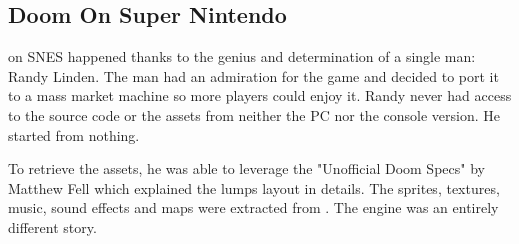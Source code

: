 \pagebreak


\par
{}
















\subsection{Doom On Super Nintendo}

\doom{} on SNES happened thanks to the genius and determination of a single man: Randy Linden. The man had an admiration for the game and decided to port it to a mass market machine so more players could enjoy it. Randy never had access to the source code or the assets from neither the PC nor the console version. He started from nothing.\\
\par
To retrieve the assets, he was able to leverage the "Unofficial Doom Specs" by Matthew Fell which explained the  lumps layout in details. The sprites, textures, music, sound effects and maps were extracted from . The engine was an entirely different story.\\
\par

